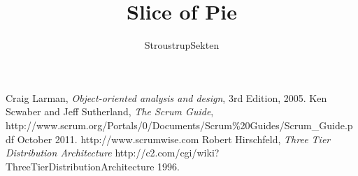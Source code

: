 \documentclass[a4paper,11pt]{article}
\author{StroustrupSekten}
\title{Slice of Pie}
\begin{document}
\maketitle

\tableofcontents
\newpage







\begin{thebibliography}{9}
    Craig Larman,
    \emph{Object-oriented analysis and design},
    3rd Edition,
    2005.
    Ken Scwaber and Jeff Sutherland,
    \emph{The Scrum Guide},
    http://www.scrum.org/Portals/0/Documents/Scrum\%20Guides/Scrum_Guide.pdf
    October 2011.
  http://www.scrumwise.com
  Robert Hirschfeld,
  \emph{Three Tier Distribution Architecture}
  http://c2.com/cgi/wiki?ThreeTierDistributionArchitecture
  1996.
\end{thebibliography}
\end{document}
